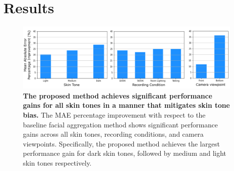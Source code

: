 %
%

\chapter{Results} \label{chap:methods}

\begin{figure}[t]
    \centering
    \includegraphics[width=\linewidth]{include/fig-barplot-MAE-percentage.pdf}
    \caption{\textbf{The proposed method achieves significant performance gains for all skin tones in a manner that mitigates skin tone bias.} The MAE percentage improvement with respect to the baseline facial aggregation method shows significant performance gains across all skin tones, recording conditions, and camera viewpoints. Specifically, the proposed method achieves the largest performance gain for dark skin tones, followed by medium and light skin tones respectively.}
    \label{fig:barplot}
\end{figure}

